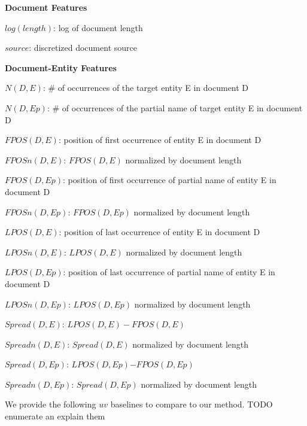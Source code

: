 \documentclass{article}
\begin{document}
\begin{itemize*}
    \item \textbf{Document Features}
    \begin{itemize*}
        \item $log(length)$: log of document length
        \item $source$: discretized document source
    \end{itemize*}
    \item \textbf{Document-Entity Features}
    \begin{itemize*}
        \item $N(D,E)$: \# of occurrences of the target entity E in document D
        \item $N(D,Ep)$: \# of occurrences of the partial name of target entity E in document D
        \item $FPOS(D,E)$: position of first occurrence of entity E in document D
        \item $FPOSn(D,E)$: $FPOS(D,E)$ normalized by document length
        \item $FPOS(D,Ep)$: position of first occurrence of partial name of entity E in document D
        \item $FPOSn(D,Ep)$: $FPOS(D,Ep)$ normalized by document length
        \item $LPOS(D,E)$: position of last occurrence of entity E in document D
        \item $LPOSn(D,E)$: $LPOS(D,E)$ normalized by document length
        \item $LPOS(D,Ep)$: position of last occurrence of partial name of entity E in document D
        \item $LPOSn(D,Ep)$: $LPOS(D,Ep)$ normalized by document length
        \item $Spread(D,E)$: $LPOS(D,E) - FPOS(D,E)$
        \item $Spreadn(D,E)$: $Spread(D,E)$ normalized by document length
        \item $Spread(D,Ep)$: $LPOS(D,Ep)\mathord{-}FPOS(D,Ep)$
        \item $Spreadn(D,Ep)$: $Spread(D,Ep)$ normalized by document length
    \end{itemize*}
\end{itemize*}

We provide the following $uv$ baselines to compare to our method.
TODO enumerate an explain them
\end{document}
